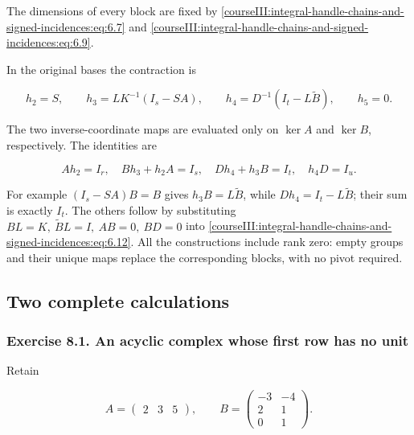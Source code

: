The dimensions of every block are fixed by \eqref{courseIII:integral-handle-chains-and-signed-incidences:eq:6.7} and \eqref{courseIII:integral-handle-chains-and-signed-incidences:eq:6.9}.

In the original bases the contraction is

\begin{equation}
h_2=S,\qquad
 h_3=LK^{-1}(I_s-SA),\qquad
 h_4=D^{-1}(I_t-L\widetilde B),\qquad h_5=0.
 \label{courseIII:integral-handle-chains-and-signed-incidences:eq:6.12}
\end{equation}

The two inverse-coordinate maps are evaluated only on \(\ker A\) and \(\ker B\), respectively. The identities are

\begin{equation}
Ah_2=I_r,\quad Bh_3+h_2A=I_s,\quad
 Dh_4+h_3B=I_t,\quad h_4D=I_u.
 \label{courseIII:integral-handle-chains-and-signed-incidences:eq:6.13}
\end{equation}

For example \((I_s-SA)B=B\) gives \(h_3B=L\widetilde B\), while \(Dh_4=I_t-L\widetilde B\); their sum is exactly \(I_t\). The others follow by substituting \(BL=K,\ \widetilde BL=I,\ AB=0,\ BD=0\) into \eqref{courseIII:integral-handle-chains-and-signed-incidences:eq:6.12}. All the constructions include rank zero: empty groups and their unique maps replace the corresponding blocks, with no pivot required.

\subsection{Two complete calculations}
\label{courseIII:integral-handle-chains-and-signed-incidences:handle-chain-exercises}

\label{courseIII:integral-handle-chains-and-signed-incidences:section-8}

\subsubsection{Exercise 8.1. An acyclic complex whose first row has no unit}
\label{courseIII:integral-handle-chains-and-signed-incidences:exercise-8.1}

\label{courseIII:handle-chains:8.1}

Retain

\begin{equation}
A=\begin{pmatrix}2&3&5\end{pmatrix},\qquad
 B=\begin{pmatrix}-3&-4\\2&1\\0&1\end{pmatrix}.
 \label{courseIII:integral-handle-chains-and-signed-incidences:eq:8.1}
\end{equation}

